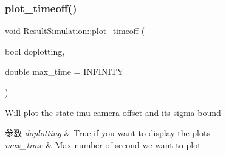 \subsubsection{\texorpdfstring{plot\+\_\+timeoff()}{plot\_timeoff()}}
{\footnotesize\ttfamily void Result\+Simulation\+::plot\+\_\+timeoff (\begin{DoxyParamCaption}\item[{bool}]{doplotting,  }\item[{double}]{max\+\_\+time = {\ttfamily INFINITY} }\end{DoxyParamCaption})}



Will plot the state imu camera offset and its sigma bound 


\begin{DoxyParams}{参数}
{\em doplotting} & True if you want to display the plots \\
\hline
{\em max\+\_\+time} & Max number of second we want to plot \\
\hline
\end{DoxyParams}
